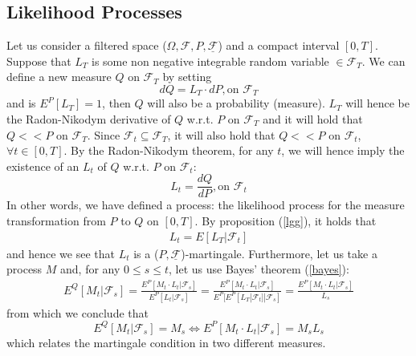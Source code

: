 \documentclass[a4paper,10pt]{report}
\theoremstyle{plain}
\theoremstyle{definition}
\newcommand\be{\begin{eqnarray}}    %
\newcommand\ee{\end{eqnarray}}
\newcommand{\FF} {\mathcal{F} }
\newcommand{\FLT} {\underline{\mathcal{F}}}
\begin{document}
\subsection{Likelihood Processes}
Let us consider a filtered space ($\Omega, \FF, P, \FLT$) and a compact interval $[0,T]$. Suppose that $L_T$ is some non negative integrable random variable $\in \FF_T$. We can define a new measure $Q$ on $\FF_T$ by setting
\[
dQ=L_T\cdot dP, \mbox{on } \FF_T 
\]
and is $E^P[L_T]=1$, then $Q$ will also be a probability (measure).
$L_T$ will hence be the Radon-Nikodym derivative of $Q$ w.r.t. $P$ on $\FF_T$ and it will hold that $Q<<P$ on $\FF_T$. Since $\FF_t\subseteq \FF_T$, it will also hold that $Q<<P$ on $\FF_t$, $\forall t\in [0,T]$.
By the Radon-Nikodym theorem, for any $t$, we will hence imply the existence of an $L_t$ of $Q$ w.r.t. $P$ on $\FF_t$:
\[
L_t = \frac{dQ}{dP}, \mbox{on } \FF_t 
\]
In other words, we have defined a process: the likelihood process for the measure transformation from $P$ to $Q$ on $[0, T]$.
By proposition (\ref{lgg}), it holds that
\be
L_t = E[L_T|\FF_t]
\ee
and hence we see that $L_t$ is a ($P, \FLT$)-martingale.
Furthermore, let us take a process $M$ and, for any $0\leq s\leq t$, let us use Bayes' theorem (\ref{bayes}):
\be 
E^Q[M_t|\FF_s]=\frac{E^P[M_t\cdot L_t|\FF_s]}{E^P[L_t|\FF_s]}=\frac{E^P[M_t\cdot L_t|\FF_s]}{E^P[E^P[L_T|\FF_t]|\FF_s]}=\frac{E^P[M_t\cdot L_t|\FF_s]}{L_s}
\ee
from which we conclude that
\[
E^Q[M_t|\FF_s]=M_s \Leftrightarrow E^P[M_t\cdot L_t|\FF_s]=M_s L_s
\]
which relates the martingale condition in two different measures.
\end{document}
